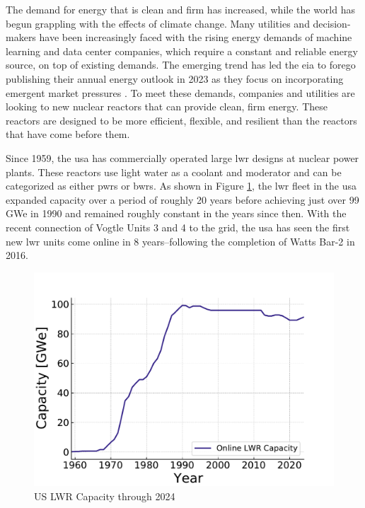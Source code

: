 The demand for energy that is clean and firm has increased, while the world has
begun grappling with the effects of climate change. Many utilities and
decision-makers have been increasingly faced with the rising energy demands of
machine learning and data center companies, which require a constant and
reliable energy source, on top of existing demands. The emerging trend has led
the \gls{eia} to forego publishing their annual energy outlook in 2023 as they
focus on incorporating emergent market pressures
\cite{eia_annual_outlook_canceled_2023}. To meet these demands, companies and
utilities are looking to new nuclear reactors that can provide clean, firm
energy. These reactors are designed to be more efficient, flexible, and
resilient than the reactors that have come before them.

Since 1959, the \gls{usa} has commercially operated large \gls{lwr} designs at
nuclear power plants. These reactors use light water as a coolant and moderator
and can be categorized as either \gls{pwr}s or \gls{bwr}s. As shown in Figure
\ref{fig:online_lwr_cap_2024}, the \gls{lwr} fleet in the \gls{usa} expanded
capacity over a period of roughly 20 years before achieving just over 99 GWe in
1990 and remained roughly constant in the years since then. With the recent
connection of Vogtle Units 3 and 4 to the grid, the \gls{usa} has seen the
first new \gls{lwr} units come online in 8 years--following the completion of
Watts Bar-2 in 2016.

\begin{figure}[htbp]
    \centering
    \includegraphics[scale=0.8]{images/intro/online_lwr_cap_2024.pdf}
    \caption{US LWR Capacity through 2024 \cite{IAEA_PRIS}}
    \label{fig:online_lwr_cap_2024}
\end{figure}

